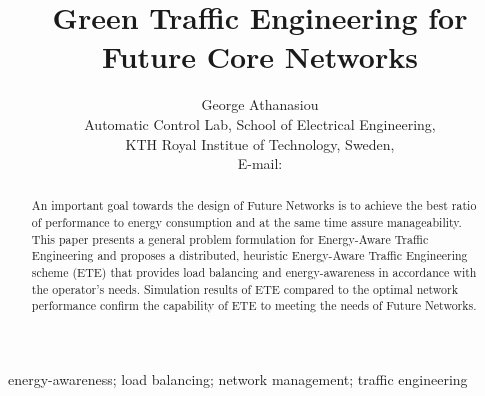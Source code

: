\documentclass[journal]{IEEEtran}
\begin{document}
\title{Green Traffic Engineering for Future Core Networks}
\author{George Athanasiou\\
Automatic Control Lab, School of Electrical Engineering, \\
KTH Royal Institue of Technology, Sweden, \\
E-mail: }






















\maketitle


\begin{abstract}
An important goal towards the design of Future Networks is to achieve the best ratio of performance to energy consumption and at the same time assure manageability. This paper presents a general problem formulation for Energy-Aware Traffic Engineering and proposes a distributed, heuristic Energy-Aware Traffic Engineering scheme (ETE) that provides load balancing and energy-awareness in accordance with the operator's needs. Simulation results of ETE compared to the optimal network performance confirm the capability of ETE to meeting the needs of Future Networks.
\end{abstract}


\begin{IEEEkeywords}
energy-awareness; load balancing; network management; traffic engineering
\end{IEEEkeywords}






\IEEEpeerreviewmaketitle
\end{document}
